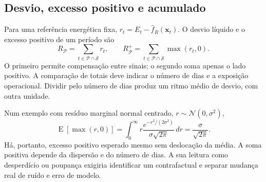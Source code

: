 \subsection{Desvio, excesso positivo e acumulado}
\label{sec:mat-excesso}
Para uma referência energética fixa, $r_t=E_t-\widehat f_R(\boldsymbol x_t)$. O desvio líquido e o excesso positivo de um período são
\begin{equation}
R_{\mathcal P}=\sum_{t\in\mathcal P\cap\mathcal S}r_t,
\qquad R_{\mathcal P}^{+}=\sum_{t\in\mathcal P\cap\mathcal S}\max(r_t,0).
\label{eq:mat-acumulados}
\end{equation}
O primeiro permite compensação entre sinais; o segundo soma apenas o lado positivo. A comparação de totais deve indicar o número de dias e a exposição operacional. Dividir pelo número de dias produz um ritmo médio de desvio, com outra unidade.

Num exemplo com resíduo marginal normal centrado, $r\sim\mathcal N(0,\sigma^2)$,
\begin{equation}
\operatorname{E}[\max(r,0)]=\int_0^\infty r\frac{e^{-r^2/(2\sigma^2)}}{\sigma\sqrt{2\pi}}\,dr
=\frac{\sigma}{\sqrt{2\pi}}.
\label{eq:mat-excesso-ruido}
\end{equation}
Há, portanto, excesso positivo esperado mesmo sem deslocação da média. A soma positiva depende da dispersão e do número de dias. A sua leitura como desperdício ou poupança exigiria identificar um contrafactual e separar mudança real de ruído e erro de modelo.

